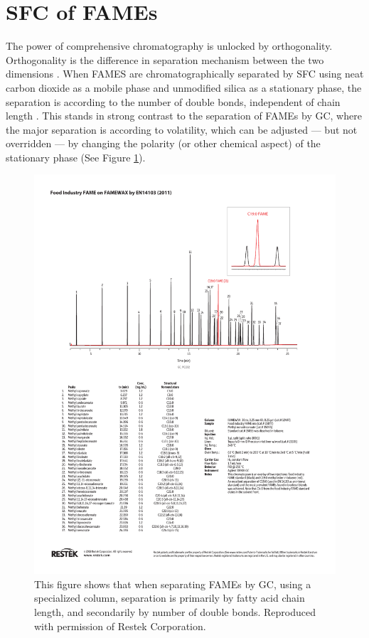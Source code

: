 \section{SFC of FAMEs}

The power of comprehensive chromatography is unlocked by orthogonality.
Orthogonality is the difference in separation mechanism between the two
dimensions \autocite{Marriott2012}. When FAMES are chromatographically separated
by SFC using neat carbon dioxide as a mobile phase and unmodified silica as a
stationary phase, the separation is according to the number of double bonds,
independent of chain length \autocite{Robertson1991, Smith1994, Smith2001}. This
stands in strong contrast to the separation of FAMEs by GC, where the major
separation is according to volatility, which can be adjusted --- but not
overridden --- by changing the polarity (or other chemical aspect) of the
stationary phase (See Figure \ref{fig:RestekFAMEsGC}).

\begin{figure}
\centering
\includegraphics[width=\textwidth]{Figures/GC_PC1332.pdf}
\decoRule

\caption[Separation of FAMEs by GC]{This figure shows that when separating FAMEs
by GC, using a specialized column, separation is primarily by fatty acid chain
length, and secondarily by number of double bonds. Reproduced with permission of
Restek Corporation.}

\label{fig:RestekFAMEsGC}
\end{figure}

